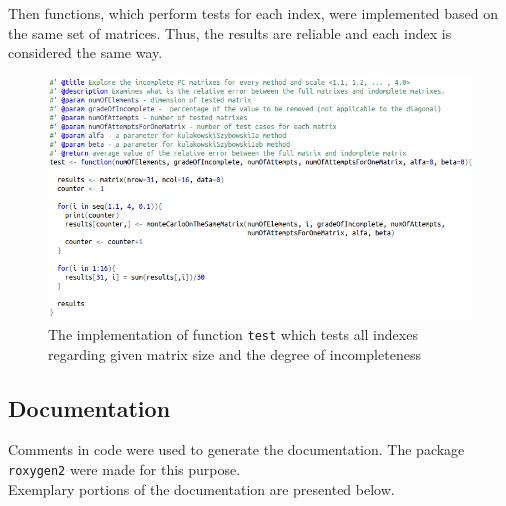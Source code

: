 Then functions, which perform tests for each index, were implemented based on the same set of matrices. Thus, the results are reliable and each index is considered the same way.

\begin{figure}[h]
\centerline{\includegraphics[scale=0.58]{images/kod22.png}}
\caption{The implementation of function \texttt{test} which tests all indexes regarding given matrix size and the degree of incompleteness}
\label{fig:rstudio}
\end{figure}


\subsection{Documentation}
Comments in code were used to generate the documentation. The package \texttt{roxygen2} were made for this purpose. \\ Exemplary portions of the documentation are presented below.

